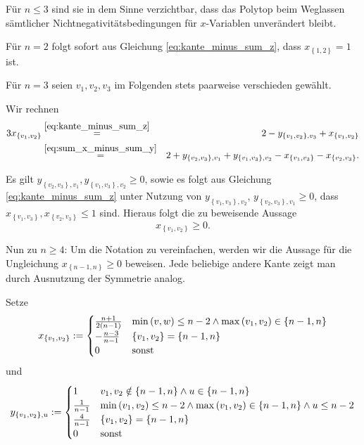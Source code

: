 \documentclass[10p,a4paper,BCOR = 12mm, DIV=15]{scrbook}
\begin{document}
{\begin{Sa}
Für $n\leq 3$ sind sie in dem Sinne verzichtbar, dass das Polytop beim Weglassen sämtlicher Nichtnegativitätsbedingungen für $x$-Variablen unverändert bleibt.
\end{Sa}
\begin{bew}
Für $n = 2$ folgt sofort aus Gleichung \eqref{eq:kante_minus_sum_z}, dass $x_{\left\{1, 2\right\}} = 1$ ist.

Für $n = 3$ seien $v_1, v_2, v_3$ im Folgenden stets paarweise verschieden gewählt.

Wir rechnen
\begin{eqnarray*}
3 x_{\left\{v_1, v_2\right\}} 
& \stackrel{\eqref{eq:kante_minus_sum_z}}{=} & 2-y_{\left\{v_1, v_2\right\}, v_3}+x_{\left\{v_1, v_2\right\}}  \\
& \stackrel{\eqref{eq:sum_x_minus_sum_y}}{=} & 2+y_{\left\{v_2, v_3\right\}, v_1}+y_{\left\{v_1, v_3\right\}, v_2}-x_{\left\{v_1, v_3\right\}}-x_{\left\{v_2, v_3\right\}}.
\end{eqnarray*}

Es gilt $y_{\left\{v_2, v_3\right\}, v_1}, y_{\left\{v_1, v_3\right\}, v_2} \geq 0$, sowie es folgt aus Gleichung \eqref{eq:kante_minus_sum_z} unter Nutzung von $y_{\left\{v_1, v_3\right\}, v_2}$, $y_{\left\{v_2, v_3\right\}, v_1} \geq 0$, dass $x_{\left\{v_1, v_3\right\}}, x_{\left\{v_2, v_3\right\}} \leq 1$ sind. Hieraus folgt die zu beweisende Aussage
\begin{displaymath}
x_{\left\{v_1, v_2\right\}} \geq 0.
\end{displaymath}

Nun zu $n\geq 4$: Um die Notation zu vereinfachen, werden wir die Aussage für die Ungleichung $x_{\left\{n-1, n\right\}} \geq 0$ beweisen. Jede beliebige andere Kante zeigt man durch Ausnutzung der Symmetrie analog.

Setze
\begin{displaymath}
x_{\left\{v_1, v_2\right\}} := \begin{cases}
\frac{n+1}{2\left(n-1\right)} & \min\left(v, w\right) \leq n-2 \wedge \max\left(v_1, v_2\right)\in \left\{n-1, n\right\} \\
-\frac{n-3}{n-1} & \left\{v_1, v_2\right\} = \left\{n-1, n\right\} \\
0 & \textnormal{sonst}
\end{cases}
\end{displaymath}
und
\begin{displaymath}
y_{\left\{v_1, v_2\right\}, u} := \begin{cases}
1 & v_1, v_2\notin \left\{n-1, n\right\} \wedge u\in \left\{n-1, n\right\} \\
\frac{1}{n-1} & \min\left(v_1, v_2\right) \leq n-2 \wedge \max\left(v_1, v_2\right)\in \left\{n-1, n\right\} \wedge u\leq n-2 \\
\frac{4}{n-1} & \left\{v_1, v_2\right\} = \left\{n-1, n\right\} \\
0 & \textnormal{sonst}
\end{cases}
\end{displaymath}


\end{bew}}
\end{document}
